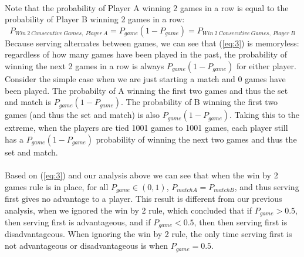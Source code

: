 \documentclass[12pt]{article}
\begin{document}
\paragraph{} Note that the probability of Player A winning 2 games in a row is equal to the probability of Player B winning 2 games in a row:
\begin{equation}
P_{Win\ 2\ Consecutive\ Games,\ Player\ A}=P_{game}(1-P_{game})=P_{Win\ 2\ Consecutive\ Games,\ Player\ B}
\label{eq:3}
\end{equation}
Because serving alternates between games, we can see that (\ref{eq:3}) is memoryless: regardless of how many games have been played in the past, the probability of winning the next 2 games in a row is always $P_{game}(1-P_{game})$ for either player. Consider the simple case when we are just starting a match and 0 games have been played. The probabilty of A winning the first two games and thus the set and match is $P_{game}(1-P_{game})$. The probability of B winning the first two games (and thus the set and match) is also $P_{game}(1-P_{game})$. Taking this to the extreme, when the players are tied 1001 games to 1001 games, each player still has a $P_{game}(1-P_{game})$ probability of winning the next two games and thus the set and match.
 
\paragraph{} Based on (\ref{eq:3}) and our analysis above we can see that when the win by 2 games rule is in place, for all $P_{game} \in (0,1)$, $P_{matchA}=P_{matchB}$, and thus serving first gives no advantage to a player. This result is different from our previous analysis, when we ignored the win by 2 rule, which concluded that if $P_{game}>0.5$, then serving first is advantageous, and if $P_{game}<0.5$, then then serving first is disadvantageous. When ignoring the win by 2 rule, the only time serving first is not advantageous or disadvantageous is when $P_{game}=0.5$.
\end{document}
